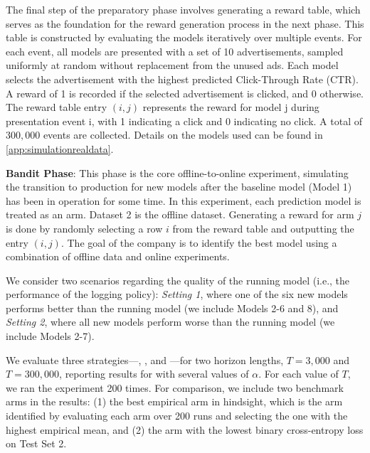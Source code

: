 The final step of the preparatory phase involves generating a reward table, which serves as the foundation for the reward generation process in the next phase. This table is constructed by evaluating the models iteratively over multiple events. For each event, all models are presented with a set of 10 advertisements, sampled uniformly at random without replacement from the unused ads. Each model selects the advertisement with the highest predicted Click-Through Rate (CTR). A reward of 1 is recorded if the selected advertisement is clicked, and 0 otherwise. The reward table entry $(i,j)$ represents the reward for model j during presentation event i, with 1 indicating a click and 0 indicating no click. A total of $300,000$ events are collected.
Details on the models used can be found in \cref{app:simulationrealdata}.

\textbf{Bandit Phase}: This phase is the core offline-to-online experiment, simulating the transition to production for new models after the baseline model (Model 1) has been in operation for some time. In this experiment, each prediction model is treated as an arm. Dataset 2 is the offline dataset. Generating a reward for arm $j$ is done by randomly selecting a row $i$ from the reward table and outputting the entry $(i,j)$. The goal of the company is to identify the best model using a combination of offline data and online experiments. 

We consider two scenarios regarding the quality of the running model (i.e., the performance of the logging policy): \textit{Setting 1}, where one of the six new models performs better than the running model (we include Models 2-6 and 8), and \textit{Setting 2}, where all new models perform worse than the running model (we include Models 2-7).

We evaluate three strategies—\alglcb, \algucb, and \algoname—for two horizon lengths, $T = 3,000$ and $T = 300,000$, reporting results for \algoname with several values of $\alpha$. For each value of $T$, we ran the experiment 200 times. For comparison, we include two benchmark arms in the results: (1) the best empirical arm in hindsight, which is the arm identified by evaluating each arm over 200 runs and selecting the one with the highest empirical mean, and (2) the arm with the lowest binary cross-entropy loss on Test Set 2.   


